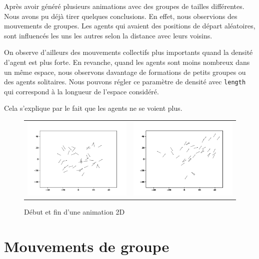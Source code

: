 \documentclass[french, a4paper, 12pt, openany]{report}
\begin{document}
   Après avoir généré plusieurs animations avec des groupes de tailles différentes. Nous avons pu déjà tirer quelques conclusions. En effet, nous observions des mouvements de groupes. Les agents qui avaient des positions de départ aléatoires, sont influencés les uns les autres selon la distance avec leurs voisins.
   
   On observe d'ailleurs des mouvements collectifs plus importants quand la densité d'agent est plus forte. En revanche, quand les agents sont moins nombreux dans un même espace, nous observons davantage de formations de petits groupes ou des agents solitaires. Nous pouvons régler ce paramètre de densité avec \verb|length| qui correspond à la longueur de l'espace considéré.
   
   Cela s'explique par le fait que les agents ne se voient plus.
   
	\begin{figure}[!h]
		\centering
		\begin{tabular}{cc}
			\includegraphics[width=8cm]{images/image_3.png} & \includegraphics[width=8cm]{images/image_4.png} \\
		\end{tabular}
		\caption{Début et fin d'une animation 2D}
	\end{figure} 
   
   
\section{Mouvements de groupe}
\end{document}

